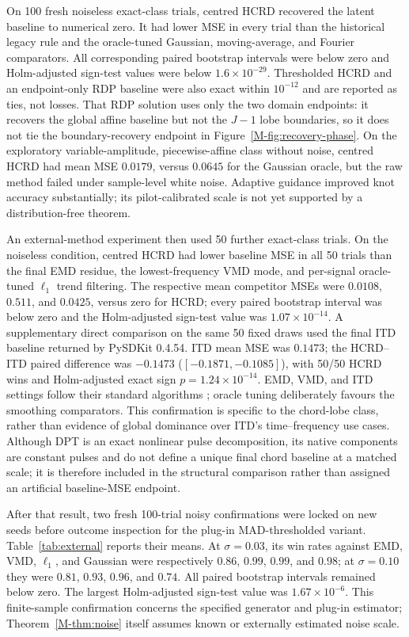 On 100 fresh noiseless exact-class trials, centred HCRD recovered the latent
baseline to numerical zero.  It had lower MSE in every trial than the historical
legacy rule and the oracle-tuned Gaussian, moving-average, and Fourier
comparators.  All corresponding paired bootstrap intervals were below zero and
Holm-adjusted sign-test values were below $1.6\times10^{-29}$.  Thresholded HCRD
and an endpoint-only RDP baseline were also exact within $10^{-12}$ and are
reported as ties, not losses.  That RDP solution uses only the two domain
endpoints: it recovers the global affine baseline but not the $J-1$ lobe
boundaries, so it does not tie the boundary-recovery endpoint in
Figure~\ref{M-fig:recovery-phase}.  On the exploratory variable-amplitude,
piecewise-affine class without noise, centred HCRD had mean MSE $0.0179$, versus
$0.0645$ for the Gaussian oracle, but the raw method failed under sample-level
white noise.  Adaptive guidance improved knot accuracy substantially; its
pilot-calibrated scale is not yet supported by a distribution-free theorem.

An external-method experiment then used 50 further exact-class trials.  On the
noiseless condition, centred HCRD had lower baseline MSE in all 50 trials than
the final EMD residue, the lowest-frequency VMD mode, and per-signal
oracle-tuned $\ell_1$ trend filtering.  The respective mean competitor MSEs
were $0.0108$, $0.511$, and $0.0425$, versus zero for HCRD; every paired
bootstrap interval was below zero and the Holm-adjusted sign-test value was
$1.07\times10^{-14}$.  A supplementary direct comparison on the same 50 fixed
draws used the final ITD baseline returned by PySDKit 0.4.54.  ITD mean MSE was
$0.1473$; the HCRD--ITD paired difference was $-0.1473$
($[-0.1871,-0.1085]$), with 50/50 HCRD wins and Holm-adjusted exact sign
$p=1.24\times10^{-14}$.  EMD, VMD, and ITD settings follow their standard
algorithms \citep{huang1998emd,dragomiretskiy2014vmd,frei2007itd}; oracle
tuning deliberately favours the smoothing comparators.  This confirmation is
specific to the chord-lobe class, rather than evidence of global dominance
over ITD's time--frequency use cases.
Although DPT is an exact nonlinear pulse decomposition, its native components
are constant pulses and do not define a unique final chord baseline at a
matched scale; it is therefore included in the structural comparison rather
than assigned an artificial baseline-MSE endpoint.

After that result, two fresh 100-trial noisy confirmations were locked on new
seeds before outcome inspection for the plug-in MAD-thresholded variant.
Table~\ref{tab:external}
reports their means.  At $\sigma=0.03$, its win rates against EMD, VMD,
$\ell_1$, and Gaussian were respectively $0.86$, $0.99$, $0.99$, and $0.98$;
at $\sigma=0.10$ they were $0.81$, $0.93$, $0.96$, and $0.74$.  All paired
bootstrap intervals remained below zero.  The largest Holm-adjusted sign-test
value was $1.67\times10^{-6}$.  This finite-sample confirmation concerns the
specified generator and plug-in estimator; Theorem~\ref{M-thm:noise} itself assumes known or
externally estimated noise scale.

